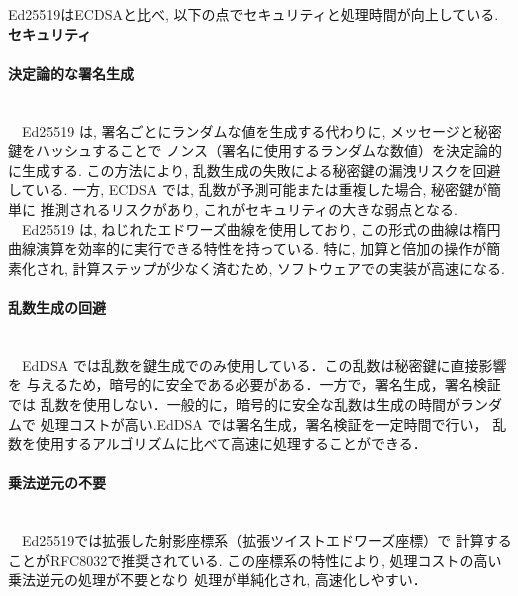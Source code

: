 Ed25519はECDSAと比べ, 以下の点でセキュリティと処理時間が向上している.\\[1em]
{\large\textbf{セキュリティ}}\\
\noindent\paragraph{決定論的な署名生成} \leavevmode\\
　Ed25519 は, 署名ごとにランダムな値を生成する代わりに, 
メッセージと秘密鍵をハッシュすることで 
ノンス（署名に使用するランダムな数値）を決定論的に生成する.
この方法により, 乱数生成の失敗による秘密鍵の漏洩リスクを回避している.
一方, ECDSA では, 乱数が予測可能または重複した場合, 秘密鍵が簡単に
推測されるリスクがあり, これがセキュリティの大きな弱点となる.
\vspace{1em}
\\[1em]
　Ed25519 は, ねじれたエドワーズ曲線を使用しており, 
この形式の曲線は楕円曲線演算を効率的に実行できる特性を持っている.
特に, 加算と倍加の操作が簡素化され, 計算ステップが少なく済むため, 
ソフトウェアでの実装が高速になる.\\

\noindent\paragraph{乱数生成の回避} \leavevmode\\
　EdDSA では乱数を鍵生成でのみ使用している．この乱数は秘密鍵に直接影響を
与えるため，暗号的に安全である必要がある．一方で，署名生成，署名検証では
乱数を使用しない．一般的に，暗号的に安全な乱数は生成の時間がランダムで
処理コストが高い.EdDSA では署名生成，署名検証を一定時間で行い，
乱数を使用するアルゴリズムに比べて高速に処理することができる．\\

\noindent\paragraph{乗法逆元の不要} \leavevmode\\
　Ed25519では拡張した射影座標系（拡張ツイストエドワーズ座標）で
計算することがRFC8032で推奨されている.
この座標系の特性により, 処理コストの高い乗法逆元の処理が不要となり
処理が単純化され, 高速化しやすい．

